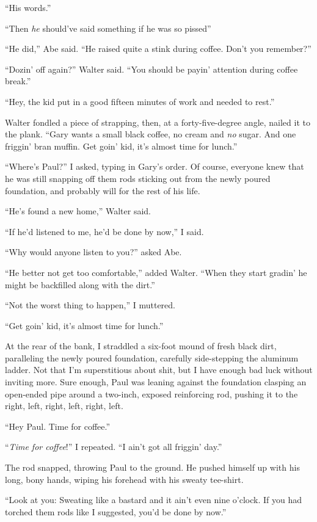 ``His words.''

``Then \emph{he} should've said something if he was so pissed'' ~

``He did,'' Abe said. ``He raised quite a stink during coffee. Don't you
remember?''

``Dozin' off again?'' Walter said. ``You should be payin' attention
during coffee break.''

``Hey, the kid put in a good fifteen minutes of work and needed to
rest.'' ~

Walter fondled a piece of strapping, then, at a forty-five-degree angle,
nailed it to the plank. ``Gary wants a small black coffee, no cream and
\emph{no} sugar. And one friggin' bran muffin. Get goin' kid, it's
almost time for lunch.''

``Where's Paul?'' I asked, typing in Gary's order. Of course, everyone
knew that he was still snapping off them rods sticking out from the
newly poured foundation, and probably will for the rest of his life.

``He's found a new home,'' Walter said.

``If he'd listened to me, he'd be done by now,'' I said. ~

``Why would anyone listen to you?'' asked Abe. ~

``He better not get too comfortable,'' added Walter. ``When they start
gradin' he might be backfilled along with the dirt.''

``Not the worst thing to happen,'' I muttered.

``Get goin' kid, it's almost time for lunch.''

At the rear of the bank, I straddled a six-foot mound of fresh black
dirt, paralleling the newly poured foundation, carefully side-stepping
the aluminum ladder. Not that I'm superstitious about shit, but I have
enough bad luck without inviting more. Sure enough, Paul was leaning
against the foundation clasping an open-ended pipe around a two-inch,
exposed reinforcing rod, pushing it to the right, left, right, left,
right, left. ~~~~

``Hey Paul. Time for coffee.''

``\emph{Time for coffee}!'' I repeated. ``I ain't got all friggin'
day.''

The rod snapped, throwing Paul to the ground. He pushed himself up with
his long, bony hands, wiping his forehead with his sweaty tee-shirt. ~~

``Look at you: Sweating like a bastard and it ain't even nine o'clock.
If you had torched them rods like I suggested, you'd be done by now.''

